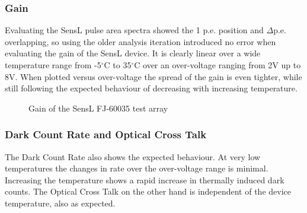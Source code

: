 \documentclass[article,type=msc,colorback,accentcolor=tud9c]{tudthesis}
\begin{document}
\begin{figure}[h]
\begin{centering}
}
\caption{SensL Test Array and pulse shape at bias-voltage = 29V0}
\label{fig:SensL_Array_PS}
\end{centering}
\end{figure}


\newpage
\subsubsection{Gain}
\label{subsubsec:SensLGain}

Evaluating the SensL pulse area spectra showed the 1 p.e. position and $\Delta$p.e. overlapping, so using the older analysis iteration introduced no error when evaluating the gain of the SensL device. It is clearly linear over a wide temperature range from -5$^\circ$C to 35$^\circ$C over an over-voltage ranging from 2V up to 8V. When plotted versus over-voltage the spread of the gain is even tighter, while still following the expected behaviour of decreasing with increasing temperature.

\begin{figure}[h]
\begin{centering}
\caption{Gain of the SensL FJ-60035 test array}
\label{fig:SensL_Gain}
\end{centering}
\end{figure}

\subsubsection{Dark Count Rate and Optical Cross Talk}
\label{subsubsec:SensLDCROCT}
The Dark Count Rate also shows the expected behaviour. At very low temperatures the changes in rate over the over-voltage range is minimal. Increasing the temperature shows a rapid increase in thermally induced dark counts. The Optical Cross Talk on the other hand is independent of the device temperature, also as expected. 
\end{document}
